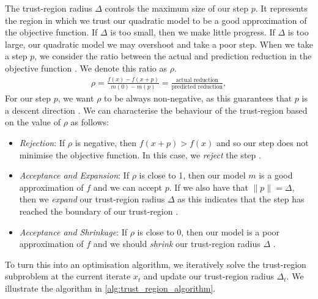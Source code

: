 The trust-region radius $\Delta$ controls the maximum size of our step $p$. It represents the region in which we trust our quadratic model to be a good approximation of the objective function. If $\Delta$ is too small, then we make little progress. If $\Delta$ is too large, our quadratic model we may overshoot and take a poor step. When we take a step $p$, we consider the ratio between the actual and prediction reduction in the objective function \citep{NoceWrig06}. We denote this ratio as $\rho$.
\begin{align}
    \rho = \frac{f(x) - f(x + p)}{m(0) - m(p)} = \frac{\text{actual reduction}}{\text{predicted reduction}},
    \label{eq:reduction_ratio}
\end{align}
For our step $p$, we want $\rho$ to be always non-negative, as this guarantees that $p$ is a descent direction \citep{NoceWrig06}. We can characterise the behaviour of the trust-region based on the value of $\rho$ as follows:
\begin{itemize}
    \item \textit{Rejection}: If $\rho$ is negative, then $f(x + p) > f(x)$ and so our step does not minimise the objective function. In this case, we \textit{reject} the step \citep{NoceWrig06}.
    \item \textit{Acceptance and Expansion}: If $\rho$ is close to 1, then our model $m$ is a good approximation of $f$ and we can accept $p$. If we also have that $\|p\| = \Delta$, then we \textit{expand} our trust-region radius $\Delta$ as this indicates that the step has reached the boundary of our trust-region \citep{NoceWrig06}.
    \item \textit{Acceptance and Shrinkage}: If $\rho$ is close to 0, then our model is a poor approximation of $f$ and we should \textit{shrink} our trust-region radius $\Delta$ \citep{NoceWrig06}.
\end{itemize}

To turn this into an optimisation algorithm, we iteratively solve the trust-region subproblem at the current iterate $x_t$ and update our trust-region radius $\Delta_t$. We illustrate the algorithm in \cref{alg:trust_region_algorithm}.

